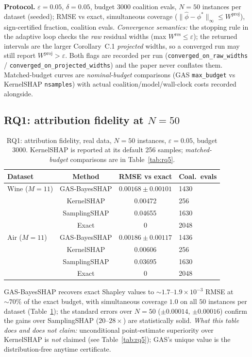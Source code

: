 \documentclass[preprint,12pt]{elsarticle}
\begin{document}
\textbf{Protocol.} $\varepsilon=0.05$, $\delta=0.05$, budget $3000$ coalition evals, $N=50$ instances per dataset (seeded); RMSE vs exact, simultaneous coverage ($\|\hat\phi-\phi^*\|_\infty\le W^{\mathrm{proj}}$), sign-certified fraction, coalition evals. \emph{Convergence semantics:} the stopping rule in the adaptive loop checks the \emph{raw} residual widths (max $W^{\mathrm{res}}\le\varepsilon$); the returned intervals are the larger Corollary~C.1 \emph{projected} widths, so a converged run may still report $W^{\mathrm{proj}}>\varepsilon$. Both flags are recorded per run (\texttt{converged\_on\_raw\_widths} / \texttt{converged\_on\_projected\_widths}) and the paper never conflates them. Matched-budget curves are \emph{nominal-budget} comparisons (GAS \texttt{max\_budget} vs KernelSHAP \texttt{nsamples}) with actual coalition/model/wall-clock costs recorded alongside.

\subsection{RQ1: attribution fidelity at $N=50$}\label{sec:rq1}

\begin{table}[htbp]\centering\small
\caption{RQ1: attribution fidelity, real data, $N=50$ instances, $\varepsilon{=}0.05$, budget $3000$. KernelSHAP is reported at its default 256 samples; \emph{matched-budget} comparisons are in Table~\ref{tab:rq5}.}
\label{tab:rq1}
\begin{tabular}{lccl}
\toprule
Dataset & Method & RMSE vs exact & Coal.\ evals \\
\midrule
Wine ($M{=}11$) & GAS-BayesSHAP & $\mathbf{0.00168\pm0.00101}$ & 1430 \\
& KernelSHAP & 0.00472 & 256 \\
& SamplingSHAP & 0.04655 & 1630 \\
& Exact & 0 & 2048 \\
\addlinespace
Air ($M{=}11$) & GAS-BayesSHAP & $\mathbf{0.00186\pm0.00117}$ & 1436 \\
& KernelSHAP & 0.00606 & 256 \\
& SamplingSHAP & 0.03695 & 1630 \\
& Exact & 0 & 2048 \\
\bottomrule
\end{tabular}
\end{table}

GAS-BayesSHAP recovers exact Shapley values to $\sim\!1.7$--$1.9\times10^{-3}$ RMSE at $\sim\!70\%$ of the exact budget, with simultaneous coverage $1.0$ on all $50$ instances per dataset (Table~\ref{tab:rq1}); the standard errors over $N=50$ ($\pm0.00014$, $\pm0.00016$) confirm the gains over SamplingSHAP ($20$--$28\times$) are statistically solid. \emph{What this table does and does not claim:} unconditional point-estimate superiority over KernelSHAP is \emph{not} claimed (see Table~\ref{tab:rq5}); GAS's unique value is the distribution-free anytime certificate.
\end{document}
